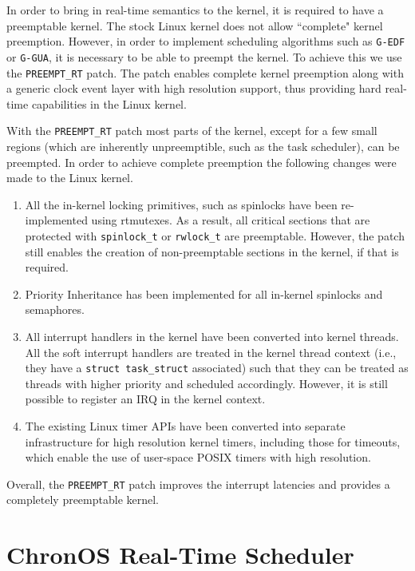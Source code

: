 \documentclass[12pt,dvips]{report}
\begin{document}
In order to bring in real-time semantics to the kernel, it is required to have a preemptable kernel. The stock Linux kernel does not allow ``complete" kernel preemption. However, in order to implement scheduling algorithms such as \texttt{G-EDF} or \texttt{G-GUA}, it is necessary to be able to preempt the kernel. To achieve this we use the \texttt{PREEMPT\_RT} patch. The patch enables complete kernel preemption along with a generic clock event layer with high resolution support, thus providing hard real-time capabilities in the Linux kernel.

With the \texttt{PREEMPT\_RT} patch most parts of the kernel, except for a few small regions (which are inherently unpreemptible, such as the task scheduler), can be preempted. In order to achieve complete preemption the following changes were made to the Linux kernel.

\begin{enumerate}
\item All the in-kernel locking primitives, such as spinlocks have been re-implemented using rtmutexes. As a result, all critical sections that are protected with \texttt{spinlock\_t} or \texttt{rwlock\_t} are preemptable. However, the patch still enables the creation of non-preemptable sections in the kernel, if that is required.
\item Priority Inheritance has been implemented for all in-kernel spinlocks and semaphores.
\item All interrupt handlers in the kernel have been converted into kernel threads. All the soft interrupt handlers are treated in the kernel thread context (i.e., they have a \texttt{struct task\_struct} associated) such that they can be treated as threads with higher priority and scheduled accordingly. However, it is still possible to register an IRQ in the kernel context.
\item The existing Linux timer APIs have been converted into separate infrastructure for high resolution kernel timers, including those for timeouts, which enable the use of user-space POSIX timers with high resolution.
\end{enumerate}

Overall, the \texttt{PREEMPT\_RT} patch improves the interrupt latencies and provides a completely preemptable kernel.


\section{ChronOS Real-Time Scheduler}\label{sec:chronos-rt-sched}
\end{document}
